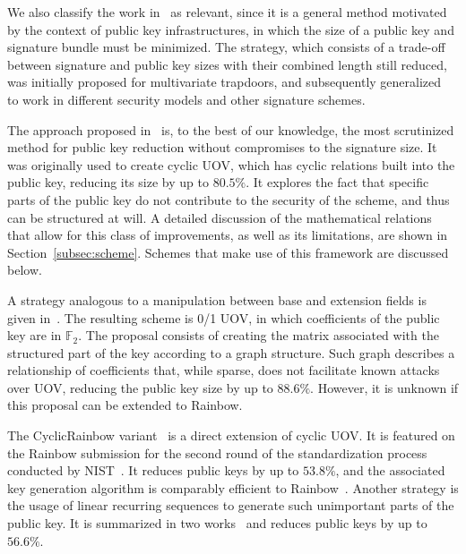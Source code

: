 \documentclass[draft, 12pt, a4paper, oneside]{memoir}
\theoremstyle{definition}
\begin{document}
We also classify the work in~\cite{Szepieniec:201706} as relevant, since it is a general method motivated by the context of public key infrastructures, in which the size of a public key and signature bundle must be minimized. The strategy, which consists of a trade-off between signature and public key sizes with their combined length still reduced, was initially proposed for multivariate trapdoors, and subsequently generalized~\cite{Beullens:201808} to work in different security models and other signature schemes.

The approach proposed in~\cite{Petzoldt:201006} is, to the best of our knowledge, the most scrutinized method for public key reduction without compromises to the signature size. It was originally used to create cyclic UOV, which has cyclic relations built into the public key, reducing its size by up to $80.5\%$. It explores the fact that specific parts of the public key do not contribute to the security of the scheme, and thus can be structured at will. A detailed discussion of the mathematical relations that allow for this class of improvements, as well as its limitations, are shown in Section~\ref{subsec:scheme}. Schemes that make use of this framework are discussed below. 


A strategy analogous to a manipulation between base and extension fields is given in~\cite{Petzoldt:201109}. The resulting scheme is 0/1 UOV, in which coefficients of the public key are in $\mathbb{F}_{2}$. The proposal consists of creating the matrix associated with the structured part of the key according to a graph structure. Such graph describes a relationship of coefficients that, while sparse, does not facilitate known attacks over UOV, reducing the public key size by up to $88.6\%$. However, it is unknown if this proposal can be extended to Rainbow.

The CyclicRainbow variant~\cite{Petzoldt:201012} is a direct extension of cyclic UOV. It is featured on the Rainbow submission for the second round of the standardization process conducted by NIST~\cite{Ding:201901}. It reduces public keys by up to $53.8\%$, and the associated key generation algorithm is comparably efficient to Rainbow~\cite{Petzoldt:202004}. Another strategy is the usage of linear recurring sequences to generate such unimportant parts of the public key. It is summarized in two works~\cite{Petzoldt:201103,Petzoldt:201211} and reduces public keys by up to $56.6\%$.
\end{document}
